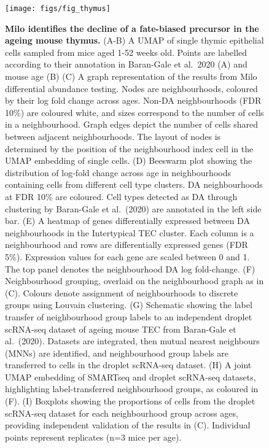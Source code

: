 \documentclass[
  10pt,
]{article}
\begin{document}
\begin{figure}[ht]
\texttt{[image: figs/fig\_thymus]} \caption{\textbf{Milo identifies the decline of a fate-biased precursor in the ageing mouse thymus.}
(A-B) A UMAP of single thymic epithelial cells sampled from mice aged 1-52 weeks old. Points are labelled according to their annotation in Baran-Gale et al.~2020 (A) and mouse age (B)
(C) A graph representation of the results from Milo differential abundance testing. Nodes are neighbourhoods, coloured by their log fold change across ages. Non-DA neighbourhoods (FDR 10\%) are coloured white, and sizes correspond to the number of cells in a neighbourhood. Graph edges depict the number of cells shared between adjacent neighbourhoods. The layout of nodes is determined by the position of the neighbourhood index cell in the UMAP embedding of single cells.
(D) Beeswarm plot showing the distribution of log-fold change across age in neighbourhoods containing cells from different cell type clusters. DA neighbourhoods at FDR 10\% are coloured. Cell types detected as DA through clustering by Baran-Gale et al.~(2020) are annotated in the left side bar.
(E) A heatmap of genes differentially expressed between DA neighbourhoods in the Intertypical TEC cluster. Each column is a neighbourhood and rows are differentially expressed genes (FDR 5\%). Expression values for each gene are scaled between 0 and 1. The top panel denotes the neighbourhood DA log fold-change.
(F) Neighbourhood grouping, overlaid on the neighbourhood graph as in (C). Colours denote assignment of neighbourhoods to discrete groups using Louvain clustering.
(G) Schematic showing the label transfer of neighbourhood group labels to an independent droplet scRNA-seq dataset of ageing mouse TEC from Baran-Gale et al.~(2020). Datasets are integrated, then mutual nearest neighbours (MNNs) are identified, and neighbourhood group labels are transferred to cells in the droplet scRNA-seq dataset.
(H) A joint UMAP embedding of SMARTseq and droplet scRNA-seq datasets, highlighting label-transferred neighbourhood groups, as coloured in (F).
(I) Boxplots showing the proportions of cells from the droplet scRNA-seq dataset for each neighbourhood group across ages, providing independent validation of the results in (C). Individual points represent replicates (n=3 mice per age).}\label{fig:fig-4}
\end{figure}
\end{document}
